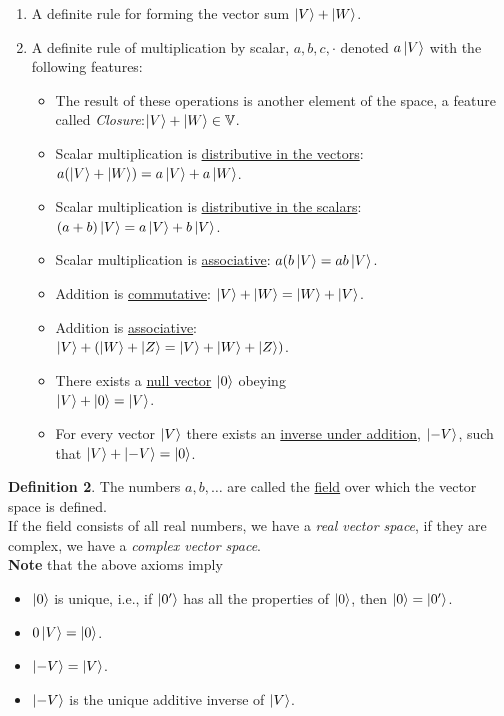 \documentclass{article}
\begin{document}
\begin{enumerate}
    \item A definite rule for forming the vector sum $\ket{V} + \ket{W}$.
    \item A definite rule of multiplication by scalar, $a,b,c,\cdot$ denoted $a\ket{V}$ with the following features:
    \begin{itemize}
        \item The result of these operations is another element of the space, a feature called \textit{Closure}:$\ket{V}+\ket{W} \in \mathbb{V}$.
        \item Scalar multiplication is  \underline{distributive in the vectors}:\\ 
        $a(\ket{V}+\ket{W}) = a\ket{V} + a\ket{W}$.
        \item Scalar multiplication is \underline{distributive in the scalars}:\\ 
        $(a+b)\ket{V} = a\ket{V} + b\ket{V}$.
        \item Scalar multiplication is \underline{associative}: $a(b\ket{V} = ab\ket{V}$.
        \item Addition is \underline{commutative}: $\ket{V} + \ket{W} = \ket{W} + \ket{V}$.
        \item Addition is \underline{associative}:\\ 
        $\ket{V} + (\ket{W}+\ket{Z} = \ket{V}+\ket{W}+\ket{Z})$.
        \item There exists a \underline{null vector} $\ket{0}$ obeying \\
        $\ket{V}+\ket{0}=\ket{V}$.
        \item For every vector $\ket{V}$ there exists an \underline{inverse under addition}, $\ket{-V}$, such that $\ket{V}+\ket{-V}=\ket{0} $.
    \end{itemize}
\end{enumerate}

\textbf{Definition 2}. The numbers $a, b, …$ are called the \underline{field} over which the vector space is defined.\\
If the field consists of all real numbers, we have a \textit{real vector space}, if they are complex, we have a \textit{complex vector space}.\\
\textbf{Note} that the above axioms imply
\begin{itemize}
    \item $\ket{0}$ is unique, i.e., if $\ket{0'}$ has all the properties of $\ket{0}$, then $\ket{0}=\ket{0'}$.
    \item $0\ket{V} = \ket{0}$.
    \item $\ket{-V} = \ket{V}$.
    \item $\ket{-V}$ is the unique additive inverse of $\ket{V}$.
\end{itemize}
\end{document}
